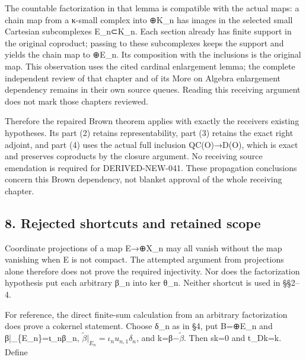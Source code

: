 \documentclass[11pt]{article}
\begin{document}
The countable factorization in that lemma is compatible with the actual maps:\allowbreak{} a chain map from a κ-small complex into \allowbreak{}⊕K\_\allowbreak{}n has images in the selected small Cartesian subcomplexes E\_\allowbreak{}n⊂K\_\allowbreak{}n. Each section already has finite support in the original coproduct; passing to these subcomplexes keeps the support and yields the chain map to \allowbreak{}⊕E\_\allowbreak{}n. Its composition with the inclusions is the original map. This observation uses the cited cardinal enlargement lemma; the complete independent review of that chapter and of its More on Algebra enlargement dependency remains in their own source queues. Reading this receiving argument does not mark those chapters reviewed.

Therefore the repaired Brown theorem applies with exactly the receiver\textquotesingle s existing hypotheses. Its part (2)\allowbreak{} retains representability,\allowbreak{} part (3)\allowbreak{} retains the exact right adjoint,\allowbreak{} and part (4)\allowbreak{} uses the actual full inclusion QC(O)\allowbreak{}\allowbreak{}→D(O)\allowbreak{},\allowbreak{} which is exact and preserves coproducts by the closure argument. No receiving source emendation is required for DERIVED-NEW-041. These propagation conclusions concern this Brown dependency,\allowbreak{} not blanket approval of the whole receiving chapter.

\subsection{8. Rejected shortcuts and retained scope}\label{proofs-11460-11655-rejected-shortcuts-and-retained-scope}

Coordinate projections of a map E\allowbreak{}→\allowbreak{}⊕X\_\allowbreak{}n may all vanish without the map vanishing when E is not compact. The attempted argument from projections alone therefore does not prove the required injectivity. Nor does the factorization hypothesis put each arbitrary β\_\allowbreak{}n into ker θ\_\allowbreak{}n. Neither shortcut is used in §§2–\allowbreak{}4.

For reference,\allowbreak{} the direct finite-sum calculation from an arbitrary factorization does prove a cokernel statement. Choose δ\_\allowbreak{}n as in §4,\allowbreak{} put B\allowbreak{}=\allowbreak{}⊕E\_\allowbreak{}n and β|\_\allowbreak{}\{E\_\allowbreak{}n\}\allowbreak{}=ι\_\allowbreak{}nβ\_\allowbreak{}n,\allowbreak{} \(\widetilde\beta|_{E_n}=\iota_nu_{n,1}\delta_n\),\allowbreak{} and k\allowbreak{}=β−\(\widetilde\beta\). Then sk\allowbreak{}=0 and t\_\allowbreak{}Dk\allowbreak{}=k. Define
\end{document}
